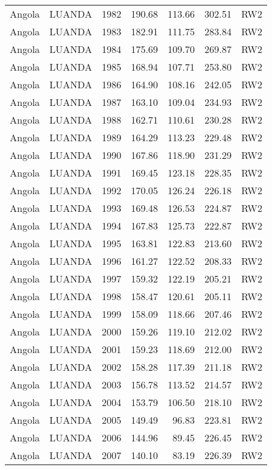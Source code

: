 \begin{longtable}{lllrrrl}
  Angola & LUANDA & 1982 & 190.68 & 113.66 & 302.51 & RW2 \\ 
  Angola & LUANDA & 1983 & 182.91 & 111.75 & 283.84 & RW2 \\ 
  Angola & LUANDA & 1984 & 175.69 & 109.70 & 269.87 & RW2 \\ 
  Angola & LUANDA & 1985 & 168.94 & 107.71 & 253.80 & RW2 \\ 
  Angola & LUANDA & 1986 & 164.90 & 108.16 & 242.05 & RW2 \\ 
  Angola & LUANDA & 1987 & 163.10 & 109.04 & 234.93 & RW2 \\ 
  Angola & LUANDA & 1988 & 162.71 & 110.61 & 230.28 & RW2 \\ 
  Angola & LUANDA & 1989 & 164.29 & 113.23 & 229.48 & RW2 \\ 
  Angola & LUANDA & 1990 & 167.86 & 118.90 & 231.29 & RW2 \\ 
  Angola & LUANDA & 1991 & 169.45 & 123.18 & 228.35 & RW2 \\ 
  Angola & LUANDA & 1992 & 170.05 & 126.24 & 226.18 & RW2 \\ 
  Angola & LUANDA & 1993 & 169.48 & 126.53 & 224.87 & RW2 \\ 
  Angola & LUANDA & 1994 & 167.83 & 125.73 & 222.87 & RW2 \\ 
  Angola & LUANDA & 1995 & 163.81 & 122.83 & 213.60 & RW2 \\ 
  Angola & LUANDA & 1996 & 161.27 & 122.52 & 208.33 & RW2 \\ 
  Angola & LUANDA & 1997 & 159.32 & 122.19 & 205.21 & RW2 \\ 
  Angola & LUANDA & 1998 & 158.47 & 120.61 & 205.11 & RW2 \\ 
  Angola & LUANDA & 1999 & 158.09 & 118.66 & 207.46 & RW2 \\ 
  Angola & LUANDA & 2000 & 159.26 & 119.10 & 212.02 & RW2 \\ 
  Angola & LUANDA & 2001 & 159.23 & 118.69 & 212.00 & RW2 \\ 
  Angola & LUANDA & 2002 & 158.28 & 117.39 & 211.18 & RW2 \\ 
  Angola & LUANDA & 2003 & 156.78 & 113.52 & 214.57 & RW2 \\ 
  Angola & LUANDA & 2004 & 153.79 & 106.50 & 218.10 & RW2 \\ 
  Angola & LUANDA & 2005 & 149.49 & 96.83 & 223.81 & RW2 \\ 
  Angola & LUANDA & 2006 & 144.96 & 89.45 & 226.45 & RW2 \\ 
  Angola & LUANDA & 2007 & 140.10 & 83.19 & 226.39 & RW2 \\ 

\end{longtable}
